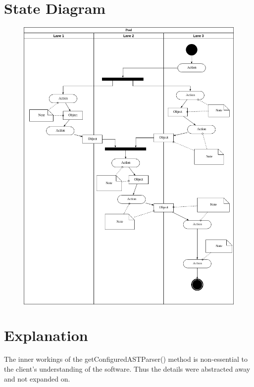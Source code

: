 \documentclass[12p]{article}
\begin{document}
\section{State Diagram}
\begin{figure}[H]
  \includegraphics[width=1.0\textwidth]{State.png}
  \caption{} %
  \label{fig:state}
\end{figure}

\section{Explanation}
The inner workings of the getConfiguredASTParser() method is non-essential to the client's understanding of the software. Thus the details were abstracted away and not expanded on.
\end{document}
